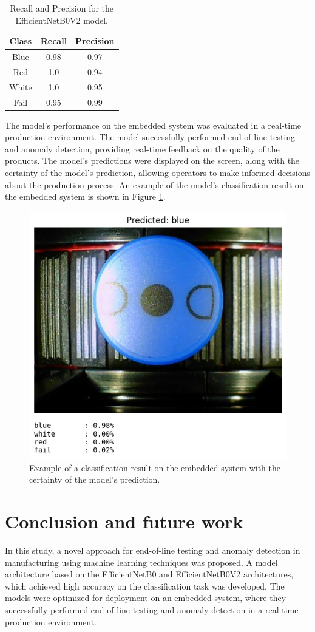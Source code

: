 \documentclass[lettersize,journal]{IEEEtran}
\begin{document}
\begin{table}[!h]
  \centering
  \caption{Recall and Precision for the EfficientNetB0V2 model.}
  \begin{tabular}{|c|c|c|}
    \hline
    \textbf{Class} & \textbf{Recall} & \textbf{Precision} \\
    \hline
    Blue & 0.98 & 0.97 \\
    Red & 1.0 & 0.94 \\
    White & 1.0 & 0.95 \\
    Fail & 0.95 & 0.99 \\
    \hline
  \end{tabular}
  \label{tab:recall_precision}
\end{table}

The model's performance on the embedded system was evaluated in a real-time production environment. The model successfully performed end-of-line testing and anomaly detection, providing real-time feedback on the quality of the products. The model's predictions were displayed on the screen, along with the certainty of the model's prediction, allowing operators to make informed decisions about the production process. An example of the model's classification result on the embedded system is shown in Figure \ref{fig:loss_accuracy}.

\begin{figure}[!h]
  \centering
  \includegraphics[width=.4\textwidth]{images/classification.png}
  \caption{Example of a classification result on the embedded system with the certainty of the model's prediction.}
  \label{fig:loss_accuracy}
\end{figure}

\section{Conclusion and future work}

In this study, a novel approach for end-of-line testing and anomaly detection in manufacturing using machine learning techniques was proposed. A model architecture based on the EfficientNetB0 and EfficientNetB0V2 architectures, which achieved high accuracy on the classification task was developed. The models were optimized for deployment on an embedded system, where they successfully performed end-of-line testing and anomaly detection in a real-time production environment.
\end{document}
